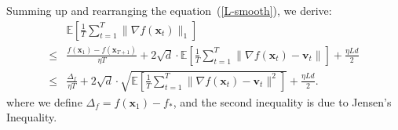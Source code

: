\documentclass{article}
\newcommand{\E}{\mathbb{E}}
\def \E {\mathbb{E}}
\def \v {\mathbf{v}}
\def \x {\mathbf{x}}
\def \E {\mathbb{E}}
\def \x {\mathbf{x}}
\def \v {\mathbf{v}}
\begin{document}
Summing up and rearranging the equation~(\ref{L-smooth}), we derive:
\begin{equation}\label{smooth}
    \begin{split}
        & \E\left[\frac{1}{T}\sum_{t=1}^{T} \|\nabla f(\x_t)\|_1\right] \\
        \leq &\frac{f(\x_1) - f(\x_{T+1})}{\eta T} +  2\sqrt{d} \cdot \E\left[\frac{1}{T}\sum_{t=1}^{T} \|\nabla f(\x_t) - \v_t\|\right] + \frac{\eta L d}{2} \\
        \leq & \frac{\Delta_f}{\eta T} +2\sqrt{d} \cdot \sqrt{\E\left[\frac{1}{T}\sum_{t=1}^{T} \|\nabla f(\x_t) - \v_t\|^2\right]}+ \frac{\eta L d}{2}.
    \end{split}
\end{equation}
where we define  $\Delta_{f}=f\left(\x_{1}\right)-f_{*}$, and the second inequality is due to Jensen's Inequality.
\end{document}
